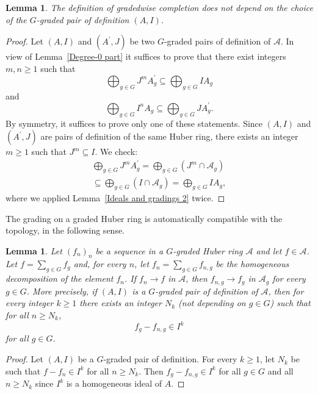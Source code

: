 \documentclass[12pt,twoside,a4paper]{article}
\newtheorem{lemma}[thm]{Lemma}
\theoremstyle{definition}
\theoremstyle{remark}
\begin{document}
\begin{lemma}\label{Gradedwise completion and pairs of definition}The definition of gradedwise completion does not depend on the choice of the $G$-graded pair of definition $(A, I)$. \end{lemma} 
\begin{proof}Let $(A, I)$ and $(A^{\prime}, J)$ be two $G$-graded pairs of definition of $\mathcal{A}$. In view of Lemma~\ref{Degree-0 part} it suffices to prove that there exist integers $m, n\geq1$ such that \begin{equation*}\bigoplus_{g\in G}J^{m}A_{g}^{\prime}\subseteq \bigoplus_{g\in G}IA_{g}\end{equation*}and \begin{equation*}\bigoplus_{g\in G}I^{n}A_{g}\subseteq \bigoplus_{g\in G}JA_{g}^{\prime}.\end{equation*}By symmetry, it suffices to prove only one of these statements. Since $(A, I)$ and $(A^{\prime}, J)$ are pairs of definition of the same Huber ring, there exists an integer $m\geq1$ such that $J^{m}\subseteq I$. We check: \begin{align*}\bigoplus_{g\in G}J^{m}A_{g}^{\prime}=\bigoplus_{g\in G}(J^{m}\cap \mathcal{A}_{g}) \\ \subseteq \bigoplus_{g\in G}(I\cap \mathcal{A}_{g})=\bigoplus_{g\in G}IA_{g},\end{align*}where we applied Lemma~\ref{Ideals and gradings 2} twice. \end{proof} 
The grading on a graded Huber ring is automatically compatible with the topology, in the following sense.
\begin{lemma}\label{Grading and topology}Let $(f_{n})_{n}$ be a sequence in a $G$-graded Huber ring $\mathcal{A}$ and let $f\in \mathcal{A}$. Let $f=\sum_{g\in G}f_{g}$ and, for every $n$, let $f_{n}=\sum_{g\in G}f_{n, g}$ be the homogeneous decomposition of the element $f_{n}$. If $f_{n}\to f$ in $\mathcal{A}$, then $f_{n, g}\to f_{g}$ in $\mathcal{A}_{g}$ for every $g\in G$. More precisely, if $(A, I)$ is a $G$-graded pair of definition of $\mathcal{A}$, then for every integer $k\geq1$ there exists an integer $N_{k}$ (not depending on $g\in G$) such that for all $n\geq N_{k}$, \begin{equation*}f_{g}-f_{n, g}\in I^{k}\end{equation*}for all $g\in G$. \end{lemma}
\begin{proof}Let $(A, I)$ be a $G$-graded pair of definition. For every $k\geq1$, let $N_{k}$ be such that $f-f_{n}\in I^{k}$ for all $n\geq N_{k}$. Then $f_{g}-f_{n, g}\in I^{k}$ for all $g\in G$ and all $n\geq N_{k}$ since $I^{k}$ is a homogeneous ideal of $A$. \end{proof}
\end{document}
